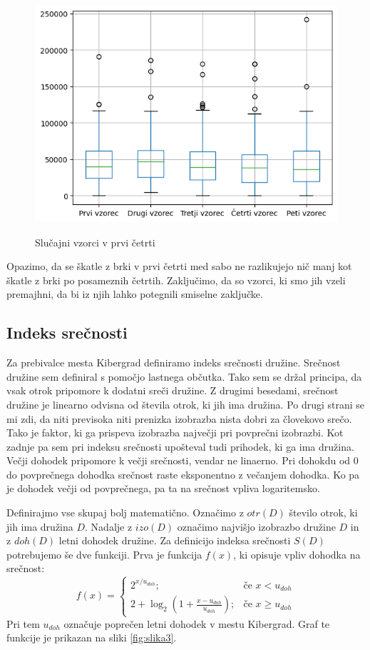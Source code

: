 \documentclass{article}
\begin{document}
\begin{figure}[H]
    \caption{Slučajni vzorci v prvi četrti}
    \centering
    \includegraphics[scale=0.8]{vzorci_severne_cetrti.png}
    \label{fig:slika2}
\end{figure}

Opazimo, da se škatle z brki v prvi četrti med sabo ne razlikujejo nič manj kot škatle z brki po posameznih četrtih. Zaključimo, da so vzorci, ki 
smo jih vzeli premajhni, da bi iz njih lahko potegnili smiselne zaključke. 



\subsection{Indeks srečnosti}

Za prebivalce mesta Kibergrad definiramo indeks srečnosti družine. Srečnost družine sem definiral s pomočjo lastnega občutka. Tako sem se držal principa, da 
vsak otrok pripomore k dodatni sreči družine. Z drugimi besedami, srečnost družine je linearno odvisna od števila otrok, ki jih ima družina. Po drugi strani se mi zdi, da niti previsoka 
niti prenizka izobrazba nista dobri za človekovo srečo. Tako je faktor, ki ga prispeva izobrazba največji pri povprečni izobrazbi. Kot zadnje pa sem pri indeksu srečnosti upošteval tudi 
prihodek, ki ga ima družina. Večji dohodek pripomore k večji srečnosti, vendar ne linaerno. Pri dohokdu od 0 do povprečnega dohodka srečnost raste eksponentno z večanjem dohodka. Ko pa je dohodek 
večji od povprečnega, pa ta na srečnost vpliva logaritemsko. 

Definirajmo vse skupaj bolj matematično. Označimo z $otr(D)$ število otrok, ki jih ima družina $D$. Nadalje z $izo(D)$ označimo najvišjo izobrazbo družine $D$ in z $doh(D)$ letni 
dohodek družine. Za definicijo indeksa srečnosti $S(D)$ potrebujemo še dve funkciji. Prva je funkcija $f(x)$, ki opisuje vpliv dohodka na srečnost:
$$
f(x) =
\begin{cases}
    2^{x/u_{doh}}; & \text{če } x < u_{doh} \\
    2 + \log_2 (1 + \frac{x - u_{doh}}{u_{doh}}); & \text{če } x \geq u_{doh}
\end{cases}
$$ 
Pri tem $u_{doh}$ označuje poprečen letni dohodek v mestu Kibergrad. Graf te funkcije je prikazan na sliki \ref{fig:slika3}.
\end{document}
